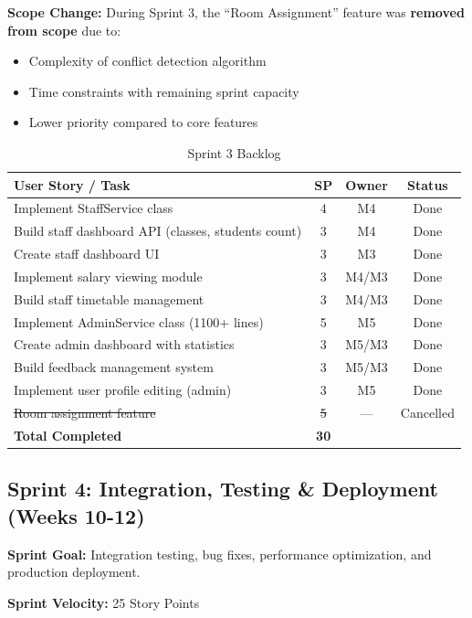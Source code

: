 \documentclass[12pt,a4paper]{article}
\begin{document}
\textbf{Scope Change:} During Sprint 3, the ``Room Assignment'' feature was \textbf{removed from scope} due to:
\begin{itemize}[noitemsep]
    \item Complexity of conflict detection algorithm
    \item Time constraints with remaining sprint capacity
    \item Lower priority compared to core features
\end{itemize}

\begin{table}[H]
\centering
\begin{tabularx}{\textwidth}{|X|c|c|c|}
\hline
\textbf{User Story / Task} & \textbf{SP} & \textbf{Owner} & \textbf{Status} \\
\hline
Implement StaffService class & 4 & M4 & Done \\
\hline
Build staff dashboard API (classes, students count) & 3 & M4 & Done \\
\hline
Create staff dashboard UI & 3 & M3 & Done \\
\hline
Implement salary viewing module & 3 & M4/M3 & Done \\
\hline
Build staff timetable management & 3 & M4/M3 & Done \\
\hline
Implement AdminService class (1100+ lines) & 5 & M5 & Done \\
\hline
Create admin dashboard with statistics & 3 & M5/M3 & Done \\
\hline
Build feedback management system & 3 & M5/M3 & Done \\
\hline
Implement user profile editing (admin) & 3 & M5 & Done \\
\hline
\sout{Room assignment feature} & \sout{5} & --- & Cancelled \\
\hline
\textbf{Total Completed} & \textbf{30} & & \\
\hline
\end{tabularx}
\caption{Sprint 3 Backlog}
\end{table}

\subsection{Sprint 4: Integration, Testing \& Deployment (Weeks 10-12)}

\textbf{Sprint Goal:} Integration testing, bug fixes, performance optimization, and production deployment.

\textbf{Sprint Velocity:} 25 Story Points
\end{document}
